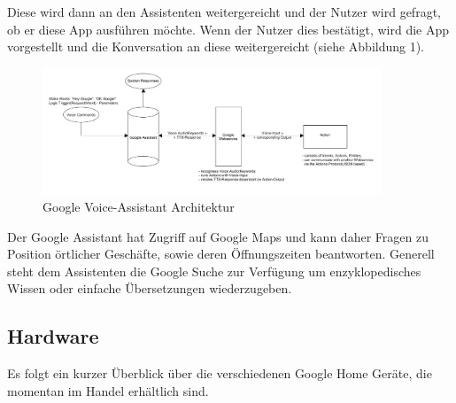 Diese wird dann an den Assistenten weitergereicht und der Nutzer wird gefragt, ob er diese App ausführen möchte. Wenn der Nutzer dies bestätigt, wird die App vorgestellt und die Konversation an diese weitergereicht (siehe Abbildung 1).\\
\begin{figure}[H]
	\centering
	\includegraphics[width=0.9\textwidth]{content/img/GoogleVA_Architektur}
	\caption[Google Voice-Assistant Architektur]{Google Voice-Assistant Architektur}
\end{figure}
Der Google Assistant hat Zugriff auf Google Maps und kann daher Fragen zu Position örtlicher Geschäfte, sowie deren Öffnungszeiten beantworten. Generell steht dem Assistenten die Google Suche zur Verfügung um enzyklopedisches Wissen oder einfache Übersetzungen wiederzugeben.



\subsection{Hardware}

Es folgt ein kurzer Überblick über die verschiedenen Google Home Geräte, die momentan im Handel erhältlich sind.

